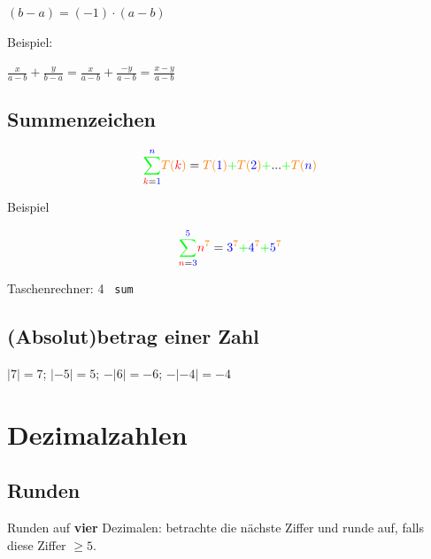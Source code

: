 \begin{multicols}{2}
$(b-a)=(-1)\cdot{}(a-b)$

Beispiel:

$\frac{x}{a-b} +  \frac{y}{b-a} = \frac{x}{a-b} + \frac{-y}{a-b} = \frac{x-y}{a-b}$

\subsection*{Summenzeichen}

  $${\color{green}\sum_{{\color{red}k}{{\color{green}{\color{black}=}\color{blue}1}}}^{\color{blue}n\color{green}}}
  {\color{orange}T(}{{\color{red}k}}{\color{orange})} = {\color{orange}T(}{\color{blue}1}{\color{orange})} {\color{green}+} {\color{orange}T(}{\color{blue}2}{\color{orange})} {\color{green}+}
  ... {\color{green}+} {\color{orange}T(}{\color{blue}n}{\color{orange})}$$

Beispiel

  $${\color{green}\sum_{{\color{red}n}{{\color{green}{\color{black}=}\color{blue}3}}}^{\color{blue}5\color{green}}}  {\color{red}n}^{{\color{orange}7}} = {\color{blue}3}^{\color{orange}7} {\color{green}+} {\color{blue}4}^{\color{orange}7} {\color{green}+} {\color{blue}5}^{\color{orange}7}$$


Taschenrechner:  4 \texttt{ sum}


\subsection*{(Absolut)betrag einer Zahl}

$|7| = 7$;  \hfill{ } $|-5| = 5$; \hfill{} $-|6|=-6$; \hfill{} $-|-4| = -4$

\TRAINER{Intervall-Schreibweise? \zB $a\in[0;1[$}

\hrulefill

\section*{Dezimalzahlen}
\subsection*{Runden}
Runden auf \textbf{\color{ForestGreen}vier}  Dezimalen: betrachte die nächste Ziffer und runde auf, falls diese {\color{red}Ziffer} $\ge 5$.


\end{multicols}
